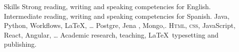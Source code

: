 
\begin{rubric}{Skills}
\entry*[Languages]
	Strong reading, writing and speaking competencies for English.
\entry*[Languages]
    Intermediate reading, writing and speaking competencies for Spanish.
	Java, Python, Workflows, \LaTeX, \ldots
\entry*[Databases]
	Postgre, Jena , Mongo,.
	\textsc{Html, css}, JavaScript, React, Angular, \ldots
\entry*[Misc.]
	Academic research, teaching, \LaTeX\ typesetting and publishing.
\end{rubric}
